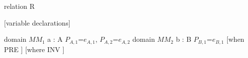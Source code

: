 relation R {
	[variable declarations]

	domain $MM_1$ a : A {$P_{A, 1}$=$e_{A, 1}$, $P_{A, 2}$=$e_{A, 2}$}
	domain $MM_2$ b : B {$P_{B, 1}$=$e_{B, 1}$}
	[when { PRE }] [where { INV }]
}
